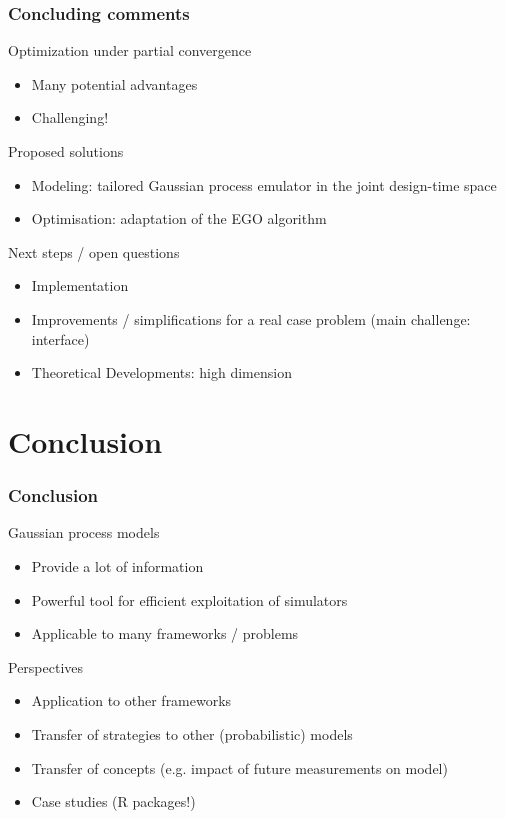 \documentclass[10pt]{beamer}
\begin{document}
{
\frametitle{Concluding comments}

\begin{block}{Optimization under partial convergence}
\vspace{-2mm}
\begin{itemize}
 \item Many potential advantages
 \item Challenging!
\end{itemize}
\end{block}
\vspace{-2mm}
\begin{block}{Proposed solutions}
\vspace{-2mm}
\begin{itemize}
 \item Modeling: tailored Gaussian process emulator in the joint design-time space
 \item Optimisation: adaptation of the EGO algorithm
\end{itemize}
\end{block}
\vspace{-2mm}
\begin{block}{Next steps / open questions}
\vspace{-2mm}
\begin{itemize}
 \item Implementation
 \item Improvements / simplifications for a real case problem (main challenge: interface)
 \item Theoretical Developments: high dimension
\end{itemize}
\end{block}
}

\section*{Conclusion}

\frame
{
\frametitle{Conclusion}
\begin{block}{Gaussian process models}
\begin{itemize}
 \item Provide a lot of information
 \item Powerful tool for efficient exploitation of simulators
 \item Applicable to many frameworks / problems
\end{itemize}
\end{block}

\begin{block}{Perspectives}
\begin{itemize}
 \item Application to other frameworks
 \item Transfer of strategies to other (probabilistic) models
 \item Transfer of concepts (e.g. impact of future measurements on model)
 \item Case studies (R packages!)
\end{itemize}
\end{block}
}
\end{document}
